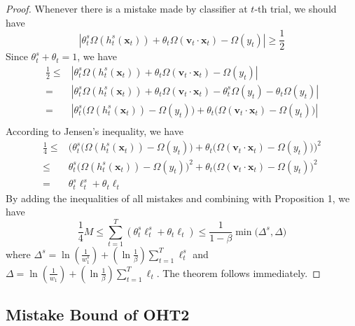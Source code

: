 \documentclass[letterpaper]{article}
\theoremstyle{remark}
\theoremstyle{definition}
\begin{document}
\begin{proof}
Whenever there is a mistake made by classifier at $t$-th trial, we should have 
$$ | \theta_{t}^{s} \varOmega(h_{t}^{s}(\mathbf{x}_t)) + \theta_t \varOmega(\mathbf{v}_t \cdot \mathbf{x}_t) - \varOmega(y_t) | \geq \frac{1}{2} $$
Since $\theta_{t}^{s} + \theta_t = 1$, we have
\begin{equation*}
\begin{split}
\frac{1}{2} \leq 
  & | \theta_{t}^{s} \varOmega(h_{t}^{s}(\mathbf{x}_t)) + \theta_t \varOmega(\mathbf{v}_t \cdot \mathbf{x}_t) - \varOmega(y_t) | \\
= & | \theta_{t}^{s} \varOmega(h_{t}^{s}(\mathbf{x}_t)) + \theta_t \varOmega(\mathbf{v}_t \cdot \mathbf{x}_t) - \theta_{t}^{s} \varOmega(y_t) - \theta_t \varOmega(y_t) | \\
= & | \theta_{t}^{s} \big( \varOmega(h_{t}^{s}(\mathbf{x}_t)) - \varOmega(y_t) \big) + \theta_t \big( \varOmega(\mathbf{v}_t \cdot \mathbf{x}_t) - \varOmega(y_t) \big) | \\
\end{split}
\end{equation*}
According to Jensen's inequality, we have
\begin{equation*}
\begin{split}
\frac{1}{4} 
\leq & \Big( \theta_{t}^{s} \big( \varOmega(h_{t}^{s}(\mathbf{x}_t)) - \varOmega(y_t) \big) + \theta_t \big( \varOmega(\mathbf{v}_t \cdot \mathbf{x}_t) - \varOmega(y_t) \big) \Big) ^ 2 \\
\leq & \theta_{t}^{s} \Big( \varOmega(h_{t}^{s}(\mathbf{x}_t)) - \varOmega(y_t) \Big) ^ 2 + \theta_t \Big( \varOmega(\mathbf{v}_t \cdot \mathbf{x}_t) - \varOmega(y_t) \Big) ^ 2 \\
   = & \theta_{t}^{s} \ell_{t}^{s} + \theta_t \ell_t 
\end{split}
\end{equation*}
By adding the inequalities of all mistakes and combining with Proposition 1, we have
$$ \frac{1}{4}M \leq \sum\limits_{t=1}^{T} ( \theta_{t}^{s} \ell_{t}^{s} + \theta_t \ell_t ) \leq \frac{1}{1-\beta} \min \big( \varDelta^s, \varDelta \big) $$
where
$ \varDelta^s = \ln(\frac{1}{w_{1}^{s}}) + (\ln \frac{1}{\beta}) \sum\limits_{t=1}^{T} \ell_{t}^{s} $ and $ \varDelta = \ln(\frac{1}{w_{1}}) + (\ln \frac{1}{\beta}) \sum\limits_{t=1}^{T} \ell_{t} $.
The theorem follows immediately.
\end{proof}

\subsection{Mistake Bound of OHT2}
\end{document}
